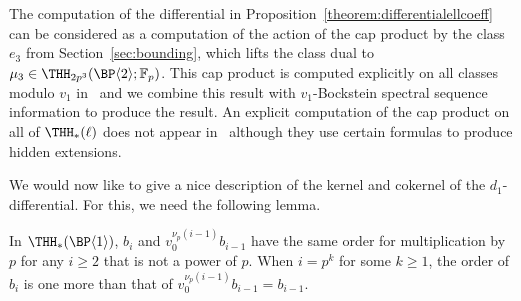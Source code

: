 \begin{remark}
The computation of the differential in Proposition~\ref{theorem:differentialellcoeff} can be considered as a computation of the action of the cap product by the class $e_{3}$ from Section~\ref{sec:bounding}, which lifts the class dual to $\mu_3\in \THH_{2p^3}(\BP\langle 2\rangle;\mathbb{F}_p)$. This cap product is computed explicitly on all classes modulo $v_1$ in~\cite[Corollary~5.7]{AHL10} and we combine this result with $v_1$-Bockstein spectral sequence information to produce the result. An explicit computation of the cap product on all of $\THH_*(\ell)$ does not appear in~\cite{AHL09} although they use certain formulas to produce hidden extensions. 
\end{remark}

We would now like to give a nice description of the kernel and cokernel of the $d_1$-differential. For this, we need the following lemma. 

\begin{lemma} \label{lem:thhell3}
  In $\THH_*(\BP\langle 1\rangle)$, $b_i$ and $v_0^{\nu_p(i-1)} b_{i-1}$ have the same order for multiplication by $p$ for any $ i \geq 2$ that is not a power of $p$. When $i = p^k$ for some $k \geq 1$, the order of $b_i$ is one more than that of $v_0^{\nu_p(i-1)} b_{i-1} = b_{i-1}$.
\end{lemma}

